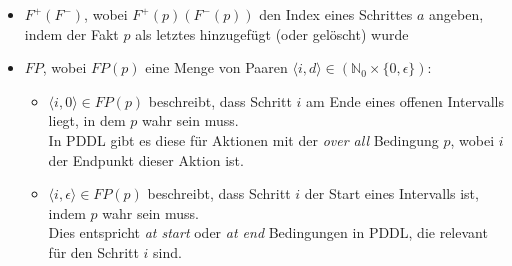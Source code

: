 \begin{itemize}
    \item $F^+(F^-)$, wobei $F^+(p)(F^-(p))$ den Index eines Schrittes $a$ angeben, indem der Fakt $p$ als letztes hinzugefügt (oder gelöscht) wurde
    \item $FP$, wobei $FP(p)$ eine Menge von Paaren $\langle i,d \rangle \in (\mathbb{N}_0 \times \{0,\epsilon\})$:\\
    \begin{itemize}
        \item $\langle i,0 \rangle \in FP(p)$ beschreibt, dass Schritt $i$ am Ende eines offenen Intervalls liegt, in dem $p$ wahr sein muss.\\
        In \ac{PDDL} gibt es diese für Aktionen mit der \emph{over all} Bedingung $p$, wobei $i$ der Endpunkt dieser Aktion ist.
        \item $\langle i,\epsilon \rangle \in FP(p)$ beschreibt, dass Schritt $i$ der Start eines Intervalls ist, indem $p$ wahr sein muss.\\
        Dies entspricht \emph{at start} oder \emph{at end} Bedingungen in \ac{PDDL}, die relevant für den Schritt $i$ sind.
    \end{itemize}
\end{itemize}

